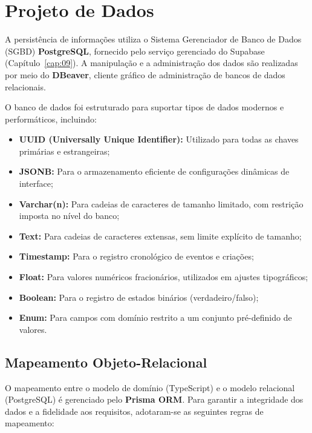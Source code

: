 \section{Projeto de Dados}
A persistência de informações utiliza o Sistema Gerenciador de Banco de Dados (SGBD) \textbf{PostgreSQL}, fornecido pelo serviço gerenciado do Supabase (Capítulo~\ref{cap:09}). A manipulação e a administração dos dados são realizadas por meio do \textbf{DBeaver}, cliente gráfico de administração de bancos de dados relacionais.

O banco de dados foi estruturado para suportar tipos de dados modernos e performáticos, incluindo:
\begin{itemize}
    \item \textbf{UUID (Universally Unique Identifier):} Utilizado para todas as chaves primárias e estrangeiras;
    \item \textbf{JSONB:} Para o armazenamento eficiente de configurações dinâmicas de interface;
    \item \textbf{Varchar(n):} Para cadeias de caracteres de tamanho limitado, com restrição imposta no nível do banco;
    \item \textbf{Text:} Para cadeias de caracteres extensas, sem limite explícito de tamanho;
    \item \textbf{Timestamp:} Para o registro cronológico de eventos e criações;
    \item \textbf{Float:} Para valores numéricos fracionários, utilizados em ajustes tipográficos;
    \item \textbf{Boolean:} Para o registro de estados binários (verdadeiro/falso);
    \item \textbf{Enum:} Para campos com domínio restrito a um conjunto pré-definido de valores.
\end{itemize}

\subsection{Mapeamento Objeto-Relacional}
O mapeamento entre o modelo de domínio (TypeScript) e o modelo relacional (PostgreSQL) é gerenciado pelo \textbf{Prisma ORM}. Para garantir a integridade dos dados e a fidelidade aos requisitos, adotaram-se as seguintes regras de mapeamento:


